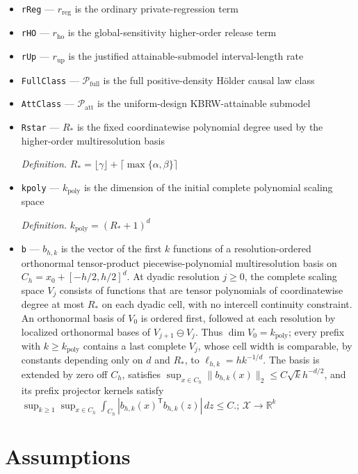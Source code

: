 \documentclass{article}
\begin{document}
\begin{itemize}
  \item \texttt{rReg} --- \(r_{\mathrm{reg}}\) is the ordinary private-regression term
  \item \texttt{rHO} --- \(r_{\mathrm{ho}}\) is the global-sensitivity higher-order release term
  \item \texttt{rUp} --- \(r_{\mathrm{up}}\) is the justified attainable-submodel interval-length rate
  \item \texttt{FullClass} --- \(\mathcal P_{\mathrm{full}}\) is the full positive-density Hölder causal law class
  \item \texttt{AttClass} --- \(\mathcal P_{\mathrm{att}}\) is the uniform-design KBRW-attainable submodel
  \item \texttt{Rstar} --- \(R_*\) is the fixed coordinatewise polynomial degree used by the higher-order multiresolution basis
  \par\smallskip\noindent\emph{Definition.} \(R_*=\lfloor\gamma\rfloor+\lceil\max\{\alpha,\beta\}\rceil\)
  \item \texttt{kpoly} --- \(k_{\mathrm{poly}}\) is the dimension of the initial complete polynomial scaling space
  \par\smallskip\noindent\emph{Definition.} \(k_{\mathrm{poly}}=(R_*+1)^d\)
  \item \texttt{b} --- \(b_{h,k}\) is the vector of the first \(k\) functions of a resolution-ordered orthonormal tensor-product piecewise-polynomial multiresolution basis on \(C_h=x_0+[-h/2,h/2]^d\).  At dyadic resolution \(j\ge0\), the complete scaling space \(V_j\) consists of functions that are tensor polynomials of coordinatewise degree at most \(R_*\) on each dyadic cell, with no intercell continuity constraint.  An orthonormal basis of \(V_0\) is ordered first, followed at each resolution by localized orthonormal bases of \(V_{j+1}\ominus V_j\).  Thus \(\dim V_0=k_{\mathrm{poly}}\); every prefix with \(k\ge k_{\mathrm{poly}}\) contains a last complete \(V_j\), whose cell width is comparable, by constants depending only on \(d\) and \(R_*\), to \(\ell_{h,k}=hk^{-1/d}\).  The basis is extended by zero off \(C_h\), satisfies \(\sup_{x\in C_h}\lVert b_{h,k}(x)\rVert_2\le C\sqrt{k}h^{-d/2}\), and its prefix projector kernels satisfy \(\sup_{k\ge1}\sup_{x\in C_h}\int_{C_h}|b_{h,k}(x)^{\mathsf T}b_{h,k}(z)|\,dz\le C\).; \(\mathcal X\to\mathbb R^k\)
\end{itemize}

\section{Assumptions}
\end{document}
